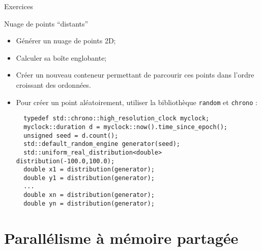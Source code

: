 \documentclass[handout,10pt]{beamer}
\begin{document}
\begin{frame}[fragile]{Exercices}
 \begin{exampleblock}{Nuage de points ``distants''}
 \begin{itemize}
 \item Générer un nuage de points 2D;
 \item Calculer sa boîte englobante;
 \item Créer un nouveau conteneur permettant de parcourir ces points dans l'ordre croissant des ordonnées.
 \item Pour créer un point aléatoirement, utiliser la bibliothèque \lstinline$random$ et \lstinline$chrono$ :
\begin{lstlisting}
  typedef std::chrono::high_resolution_clock myclock;    
  myclock::duration d = myclock::now().time_since_epoch();
  unsigned seed = d.count();
  std::default_random_engine generator(seed);
  std::uniform_real_distribution<double> distribution(-100.0,100.0);
  double x1 = distribution(generator); 
  double y1 = distribution(generator);
  ...
  double xn = distribution(generator); 
  double yn = distribution(generator);
\end{lstlisting}

 \end{itemize}
 \end{exampleblock}
\end{frame}

\section{Parallélisme à mémoire partagée}
\end{document}
